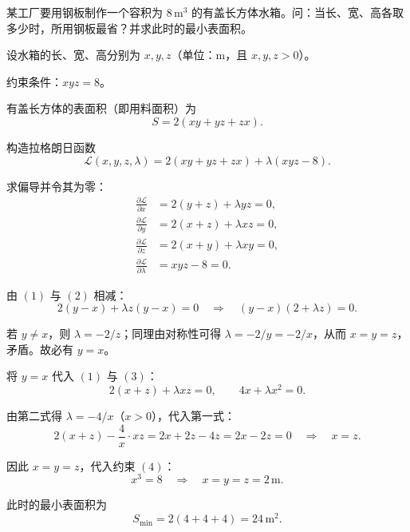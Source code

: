 \documentclass[answer]{THUExam}
\begin{document}
\begin{problem}
某工厂要用钢板制作一个容积为 $8\,\mathrm{m}^3$ 的有盖长方体水箱。问：当长、宽、高各取多少时，所用钢板最省？并求此时的最小表面积。
\end{problem}
\begin{solution}
设水箱的长、宽、高分别为 $x,y,z$（单位：m，且 $x,y,z>0$）。

约束条件：$xyz=8$。

有盖长方体的表面积（即用料面积）为
\[
S=2(xy+yz+zx).
\]

构造拉格朗日函数
\[
\mathcal{L}(x,y,z,\lambda)=2(xy+yz+zx)+\lambda(xyz-8).
\]

求偏导并令其为零：
\begin{align*}
\frac{\partial\mathcal{L}}{\partial x}&=2(y+z)+\lambda yz=0,\tag{1}\\[2pt]
\frac{\partial\mathcal{L}}{\partial y}&=2(x+z)+\lambda xz=0,\tag{2}\\[2pt]
\frac{\partial\mathcal{L}}{\partial z}&=2(x+y)+\lambda xy=0,\tag{3}\\[2pt]
\frac{\partial\mathcal{L}}{\partial\lambda}&=xyz-8=0.\tag{4}
\end{align*}

由 $(1)$ 与 $(2)$ 相减：
\[
2(y-x)+\lambda z(y-x)=0\quad\Longrightarrow\quad (y-x)(2+\lambda z)=0.
\]

若 $y\neq x$，则 $\lambda=-2/z$；同理由对称性可得 $\lambda=-2/y=-2/x$，从而 $x=y=z$，矛盾。故必有 $y=x$。

将 $y=x$ 代入 $(1)$ 与 $(3)$：
\[
2(x+z)+\lambda xz=0,\qquad 4x+\lambda x^2=0.
\]

由第二式得 $\lambda=-4/x$（$x>0$），代入第一式：
\[
2(x+z)-\frac{4}{x}\cdot xz=2x+2z-4z=2x-2z=0\quad\Longrightarrow\quad x=z.
\]

因此 $x=y=z$，代入约束 $(4)$：
\[
x^3=8\quad\Longrightarrow\quad x=y=z=\boxed{2\,\mathrm{m}}.
\]

此时的最小表面积为
\[
S_{\min}=2(4+4+4)=\boxed{24\,\mathrm{m}^2}.
\]
\end{solution}
\end{document}
